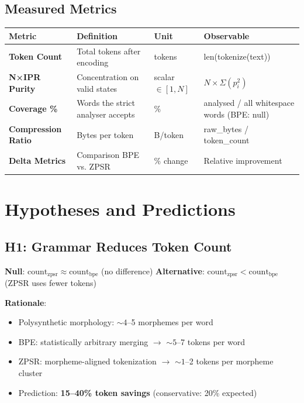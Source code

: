 \documentclass[11pt,oneside]{article}
\begin{document}
\subsection{Measured Metrics}

\begin{center}
\begin{tabular}{llll}
\toprule
Metric & Definition & Unit & Observable \\
\midrule
\textbf{Token Count} & Total tokens after encoding & tokens & len(tokenize(text)) \\
\textbf{N×IPR Purity} & Concentration on valid states & scalar $\in [1, N]$ & $N \times \Sigma(p_i^2)$ \\
\textbf{Coverage \%} & Words the strict analyser accepts & \% & analysed / all whitespace words (BPE: null) \\
\textbf{Compression Ratio} & Bytes per token & B/token & raw\_bytes / token\_count \\
\textbf{Delta Metrics} & Comparison BPE vs. ZPSR & \% change & Relative improvement \\
\bottomrule
\end{tabular}
\end{center}

\section{Hypotheses and Predictions}

\subsection{H1: Grammar Reduces Token Count}

\textbf{Null}: $\text{count}_{\text{zpsr}} \approx \text{count}_{\text{bpe}}$ (no difference)
\textbf{Alternative}: $\text{count}_{\text{zpsr}} < \text{count}_{\text{bpe}}$ (ZPSR uses fewer tokens)

\textbf{Rationale}:
\begin{itemize}
  \item Polysynthetic morphology: $\sim 4$--5 morphemes per word
  \item BPE: statistically arbitrary merging $\to$ $\sim 5$--7 tokens per word
  \item ZPSR: morpheme-aligned tokenization $\to$ $\sim 1$--2 tokens per morpheme cluster
  \item Prediction: \textbf{15--40\% token savings} (conservative: 20\% expected)
\end{itemize}
\end{document}
